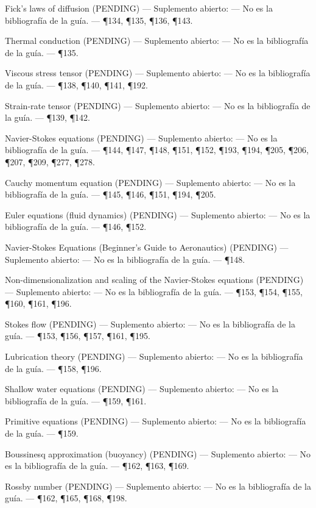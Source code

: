 \documentclass[10pt,openany]{book}
\begin{document}
\noindent Fick's laws of diffusion (PENDING) --- Suplemento abierto: --- No es la bibliografía de la guía. --- \P134, \P135, \P136, \P143.\par
\noindent Thermal conduction (PENDING) --- Suplemento abierto: --- No es la bibliografía de la guía. --- \P135.\par
\noindent Viscous stress tensor (PENDING) --- Suplemento abierto: --- No es la bibliografía de la guía. --- \P138, \P140, \P141, \P192.\par
\noindent Strain-rate tensor (PENDING) --- Suplemento abierto: --- No es la bibliografía de la guía. --- \P139, \P142.\par
\noindent Navier-Stokes equations (PENDING) --- Suplemento abierto: --- No es la bibliografía de la guía. --- \P144, \P147, \P148, \P151, \P152, \P193, \P194, \P205, \P206, \P207, \P209, \P277, \P278.\par
\noindent Cauchy momentum equation (PENDING) --- Suplemento abierto: --- No es la bibliografía de la guía. --- \P145, \P146, \P151, \P194, \P205.\par
\noindent Euler equations (fluid dynamics) (PENDING) --- Suplemento abierto: --- No es la bibliografía de la guía. --- \P146, \P152.\par
\noindent Navier-Stokes Equations (Beginner's Guide to Aeronautics) (PENDING) --- Suplemento abierto: --- No es la bibliografía de la guía. --- \P148.\par
\noindent Non-dimensionalization and scaling of the Navier-Stokes equations (PENDING) --- Suplemento abierto: --- No es la bibliografía de la guía. --- \P153, \P154, \P155, \P160, \P161, \P196.\par
\noindent Stokes flow (PENDING) --- Suplemento abierto: --- No es la bibliografía de la guía. --- \P153, \P156, \P157, \P161, \P195.\par
\noindent Lubrication theory (PENDING) --- Suplemento abierto: --- No es la bibliografía de la guía. --- \P158, \P196.\par
\noindent Shallow water equations (PENDING) --- Suplemento abierto: --- No es la bibliografía de la guía. --- \P159, \P161.\par
\noindent Primitive equations (PENDING) --- Suplemento abierto: --- No es la bibliografía de la guía. --- \P159.\par
\noindent Boussinesq approximation (buoyancy) (PENDING) --- Suplemento abierto: --- No es la bibliografía de la guía. --- \P162, \P163, \P169.\par
\noindent Rossby number (PENDING) --- Suplemento abierto: --- No es la bibliografía de la guía. --- \P162, \P165, \P168, \P198.\par
\end{document}
